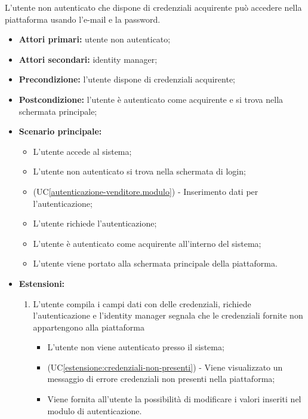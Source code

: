 L'utente non autenticato che dispone di credenziali acquirente può accedere nella piattaforma usando l'e-mail e la password.
\begin{itemize}
	\item \textbf{Attori primari:} utente non autenticato;
	\item \textbf{Attori secondari:} identity manager;
	\item \textbf{Precondizione:} l'utente dispone di credenziali acquirente;
	\item \textbf{Postcondizione:} l'utente è autenticato come acquirente e si trova nella schermata principale;
	\item \textbf{Scenario principale:}
	\begin{itemize}
		\item L'utente accede al sistema;
		\item L'utente non autenticato si trova nella schermata di login;
		\item (UC\ref{autenticazione-venditore.modulo}) - Inserimento dati per l'autenticazione;%
		\item L'utente richiede l'autenticazione;
		\item L'utente è autenticato come acquirente all'interno del sistema;
		\item L'utente viene portato alla schermata principale della piattaforma.
	\end{itemize}
	\item \textbf{Estensioni:}
	\begin{enumerate}[label=\lett]
		\item L'utente compila i campi dati con delle credenziali, richiede l'autenticazione e l'identity manager segnala che le credenziali fornite non appartengono alla piattaforma
		\begin{itemize}
			\item L'utente non viene autenticato presso il sistema;
			\item (UC\ref{estensione:credenziali-non-presenti}) - Viene visualizzato un messaggio di errore credenziali non presenti nella piattaforma;
			\item Viene fornita all'utente la possibilità di modificare i valori inseriti nel modulo di autenticazione.
		\end{itemize}
	\end{enumerate} 
\end{itemize}



